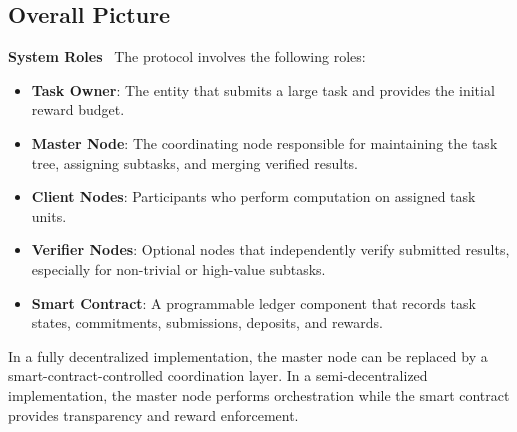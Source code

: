 \documentclass{article}
\theoremstyle{plain}
\begin{document}
\subsection{Overall Picture}


\textbf{System Roles}~
The protocol involves the following roles:

\begin{itemize}
    \item \textbf{Task Owner}: The entity that submits a large task and provides the initial reward budget.
    \item \textbf{Master Node}: The coordinating node responsible for maintaining the task tree, assigning subtasks, and merging verified results.
    \item \textbf{Client Nodes}: Participants who perform computation on assigned task units.
    \item \textbf{Verifier Nodes}: Optional nodes that independently verify submitted results, especially for non-trivial or high-value subtasks.
    \item \textbf{Smart Contract}: A programmable ledger component that records task states, commitments, submissions, deposits, and rewards.
\end{itemize}

In a fully decentralized implementation, the master node can be replaced by a smart-contract-controlled coordination layer. In a semi-decentralized implementation, the master node performs orchestration while the smart contract provides transparency and reward enforcement.
\end{document}
